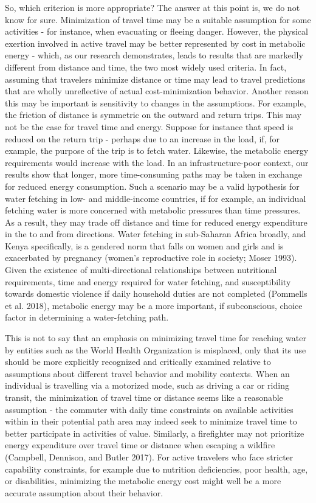 \documentclass[]{elsarticle} %
\begin{document}
So, which criterion is more appropriate? The answer at this point is, we
do not know for sure. Minimization of travel time may be a suitable
assumption for some activities - for instance, when evacuating or
fleeing danger. However, the physical exertion involved in active travel
may be better represented by cost in metabolic energy - which, as our
research demonstrates, leads to results that are markedly different from
distance and time, the two most widely used criteria. In fact, assuming
that travelers minimize distance or time may lead to travel predictions
that are wholly unreflective of actual cost-minimization behavior.
Another reason this may be important is sensitivity to changes in the
assumptions. For example, the friction of distance is symmetric on the
outward and return trips. This may not be the case for travel time and
energy. Suppose for instance that speed is reduced on the return trip -
perhaps due to an increase in the load, if, for example, the purpose of
the trip is to fetch water. Likewise, the metabolic energy requirements
would increase with the load. In an infrastructure-poor context, our
results show that longer, more time-consuming paths may be taken in
exchange for reduced energy consumption. Such a scenario may be a valid
hypothesis for water fetching in low- and middle-income countries, if
for example, an individual fetching water is more concerned with
metabolic pressures than time pressures. As a result, they may trade off
distance and time for reduced energy expenditure in the to and from
directions. Water fetching in sub-Saharan Africa broadly, and Kenya
specifically, is a gendered norm that falls on women and girls and is
exacerbated by pregnancy (women's reproductive role in society; Moser
1993). Given the existence of multi-directional relationships between
nutritional requirements, time and energy required for water fetching,
and susceptibility towards domestic violence if daily household duties
are not completed (Pommells et al. 2018), metabolic energy may be a more
important, if subconscious, choice factor in determining a
water-fetching path.

This is not to say that an emphasis on minimizing travel time for
reaching water by entities such as the World Health Organization is
misplaced, only that its use should be more explicitly recognized and
critically examined relative to assumptions about different travel
behavior and mobility contexts. When an individual is travelling via a
motorized mode, such as driving a car or riding transit, the
minimization of travel time or distance seems like a reasonable
assumption - the commuter with daily time constraints on available
activities within in their potential path area may indeed seek to
minimize travel time to better participate in activities of value.
Similarly, a firefighter may not prioritize energy expenditure over
travel time or distance when escaping a wildfire (Campbell, Dennison,
and Butler 2017). For active travelers who face stricter capability
constraints, for example due to nutrition deficiencies, poor health,
age, or disabilities, minimizing the metabolic energy cost might well be
a more accurate assumption about their behavior.
\end{document}

